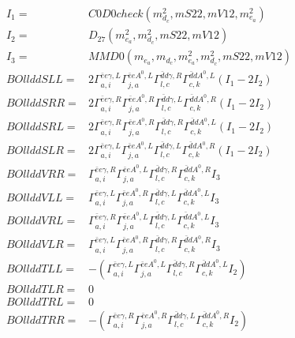 \documentclass[A4,landscape]{article}
\begin{document}
\begin{align} 
I_1 = & C0D0check(m^2_{d_{{c}}}, mS22, mV12, m^2_{e_{{a}}}) \\ 
I_2 = & D_{27}(m^2_{e_{{a}}}, m^2_{d_{{c}}}, mS22, mV12) \\ 
I_3 = & MMD0(m_{e_{{a}}}, m_{d_{{c}}}, m^2_{e_{{a}}}, m^2_{d_{{c}}}, mS22, mV12) \\ 
  BOllddSLL= & 2  \Gamma^{\bar{e}e \gamma ,L}_{a, i} \Gamma^{\bar{e}e A^0 ,L}_{j, a} \Gamma^{\bar{d}d \gamma ,R}_{l, c} \Gamma^{\bar{d}d A^0 ,L}_{c, k} (I_1 - 2 I_2) \\ 
  BOllddSRR= & 2  \Gamma^{\bar{e}e \gamma ,R}_{a, i} \Gamma^{\bar{e}e A^0 ,R}_{j, a} \Gamma^{\bar{d}d \gamma ,L}_{l, c} \Gamma^{\bar{d}d A^0 ,R}_{c, k} (I_1 - 2 I_2) \\ 
  BOllddSRL= & 2  \Gamma^{\bar{e}e \gamma ,R}_{a, i} \Gamma^{\bar{e}e A^0 ,R}_{j, a} \Gamma^{\bar{d}d \gamma ,R}_{l, c} \Gamma^{\bar{d}d A^0 ,L}_{c, k} (I_1 - 2 I_2) \\ 
  BOllddSLR= & 2  \Gamma^{\bar{e}e \gamma ,L}_{a, i} \Gamma^{\bar{e}e A^0 ,L}_{j, a} \Gamma^{\bar{d}d \gamma ,L}_{l, c} \Gamma^{\bar{d}d A^0 ,R}_{c, k} (I_1 - 2 I_2) \\ 
  BOllddVRR= &  \Gamma^{\bar{e}e \gamma ,R}_{a, i} \Gamma^{\bar{e}e A^0 ,L}_{j, a} \Gamma^{\bar{d}d \gamma ,R}_{l, c} \Gamma^{\bar{d}d A^0 ,R}_{c, k} I_3 \\ 
  BOllddVLL= &  \Gamma^{\bar{e}e \gamma ,L}_{a, i} \Gamma^{\bar{e}e A^0 ,R}_{j, a} \Gamma^{\bar{d}d \gamma ,L}_{l, c} \Gamma^{\bar{d}d A^0 ,L}_{c, k} I_3 \\ 
  BOllddVRL= &  \Gamma^{\bar{e}e \gamma ,R}_{a, i} \Gamma^{\bar{e}e A^0 ,L}_{j, a} \Gamma^{\bar{d}d \gamma ,L}_{l, c} \Gamma^{\bar{d}d A^0 ,L}_{c, k} I_3 \\ 
  BOllddVLR= &  \Gamma^{\bar{e}e \gamma ,L}_{a, i} \Gamma^{\bar{e}e A^0 ,R}_{j, a} \Gamma^{\bar{d}d \gamma ,R}_{l, c} \Gamma^{\bar{d}d A^0 ,R}_{c, k} I_3 \\ 
  BOllddTLL= & -( \Gamma^{\bar{e}e \gamma ,L}_{a, i} \Gamma^{\bar{e}e A^0 ,L}_{j, a} \Gamma^{\bar{d}d \gamma ,R}_{l, c} \Gamma^{\bar{d}d A^0 ,L}_{c, k} I_2) \\ 
  BOllddTLR= & 0 \\ 
  BOllddTRL= & 0 \\ 
  BOllddTRR= & -( \Gamma^{\bar{e}e \gamma ,R}_{a, i} \Gamma^{\bar{e}e A^0 ,R}_{j, a} \Gamma^{\bar{d}d \gamma ,L}_{l, c} \Gamma^{\bar{d}d A^0 ,R}_{c, k} I_2) \\ 
\end{align} 
\end{document}
